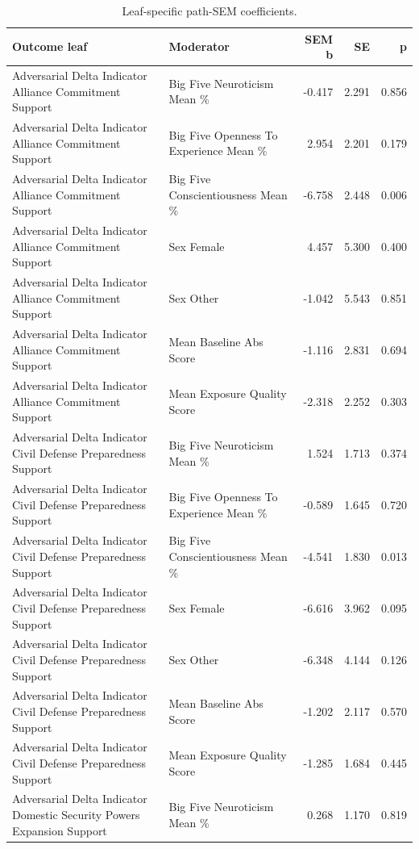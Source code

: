 \begin{table}[htbp]
\raggedright
\caption{Leaf-specific path-SEM coefficients.}
\label{tab:sempaths}
{
\footnotesize
\setlength{\tabcolsep}{4pt}
\renewcommand{\arraystretch}{1.08}
\begin{tabular}{llrrr}
\toprule
Outcome leaf & Moderator & SEM b & SE & p \\
\midrule
Adversarial Delta Indicator Alliance Commitment Support & Big Five Neuroticism Mean \% & -0.417 & 2.291 & 0.856 \\
Adversarial Delta Indicator Alliance Commitment Support & Big Five Openness To Experience Mean \% & 2.954 & 2.201 & 0.179 \\
Adversarial Delta Indicator Alliance Commitment Support & Big Five Conscientiousness Mean \% & -6.758 & 2.448 & 0.006 \\
Adversarial Delta Indicator Alliance Commitment Support & Sex Female & 4.457 & 5.300 & 0.400 \\
Adversarial Delta Indicator Alliance Commitment Support & Sex Other & -1.042 & 5.543 & 0.851 \\
Adversarial Delta Indicator Alliance Commitment Support & Mean Baseline Abs Score & -1.116 & 2.831 & 0.694 \\
Adversarial Delta Indicator Alliance Commitment Support & Mean Exposure Quality Score & -2.318 & 2.252 & 0.303 \\
Adversarial Delta Indicator Civil Defense Preparedness Support & Big Five Neuroticism Mean \% & 1.524 & 1.713 & 0.374 \\
Adversarial Delta Indicator Civil Defense Preparedness Support & Big Five Openness To Experience Mean \% & -0.589 & 1.645 & 0.720 \\
Adversarial Delta Indicator Civil Defense Preparedness Support & Big Five Conscientiousness Mean \% & -4.541 & 1.830 & 0.013 \\
Adversarial Delta Indicator Civil Defense Preparedness Support & Sex Female & -6.616 & 3.962 & 0.095 \\
Adversarial Delta Indicator Civil Defense Preparedness Support & Sex Other & -6.348 & 4.144 & 0.126 \\
Adversarial Delta Indicator Civil Defense Preparedness Support & Mean Baseline Abs Score & -1.202 & 2.117 & 0.570 \\
Adversarial Delta Indicator Civil Defense Preparedness Support & Mean Exposure Quality Score & -1.285 & 1.684 & 0.445 \\
Adversarial Delta Indicator Domestic Security Powers Expansion Support & Big Five Neuroticism Mean \% & 0.268 & 1.170 & 0.819 \\

\end{tabular}}
\end{table}
